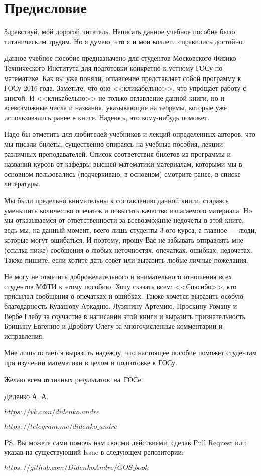 \chapter{Предисловие}
Здравствуй, мой дорогой читатель. Написать данное учебное пособие было титаническим трудом. Но я думаю, что я и мои коллеги справились достойно.

Данное учебное пособие предназначено для студентов Московского Физико-Технического Института для подготовки конкретно к устному ГОСу по математике. Как вы уже поняли, оглавление представляет собой программу к ГОСу 2016 года. Заметьте, что оно <<кликабельно>>, что упрощает работу с книгой. И <<кликабельно>> не только оглавление данной книги, но и всевозможные числа и названия, указывающие на теоремы, которые уже использовались ранее в книге. Надеюсь, это кому-нибудь поможет. 

Надо бы отметить для любителей учебников и лекций определенных авторов, что мы писали билеты, существенно опираясь на учебные пособия, лекции различных преподавателей. Список соответствия билетов из программы и названий курсов от кафедры высшей математики материалам, которыми мы в основном пользовались (подчеркиваю, в основном) смотрите ранее, в списке литературы.

Мы были предельно внимательны к составлению данной книги, стараясь уменьшить количество опечаток и повысить качество излагаемого материала. Но мы отказываемся от ответственности за всевозможные недочеты в этой книге, ведь мы, на данный момент, всего лишь студенты 3-ого курса, а главное --- люди, которые могут ошибаться. И поэтому, прошу Вас не забывать отправлять мне (ссылка ниже) сообщения о любых неточностях, опечатках, ошибках, недочетах. Также пишите, если хотите дать совет или выразить любые личные пожелания. 

Не могу не отметить доброжелательного и внимательного отношения всех студентов МФТИ к этому пособию. Хочу сказать всем: <<Спасибо>>, кто присылал сообщения о опечатках и ошибках. Также хочется выразить особую благодарность Кудашову Аркадию, Лузянину Артемию, Проскину Роману и Вербе Глебу за соучастие в написании этой книги и выразить признательность Брицыну Евгению и Дроботу Олегу за многочисленные комментарии и исправления.
 
Мне лишь остается выразить надежду, что настоящее пособие поможет студентам при изучении математики в целом и подготовке к ГОСу.
\vspace*{\baselineskip}

Желаю всем отличных результатов~на~ГОСе.

\mbox{}

\noindent Диденко А. А.

\noindent\href{https://vk.com/didenko.andre}{$https://vk.com/didenko.andre$}

\noindent\href{https://telegram.me/didenko_andre}{$https://telegram.me/didenko\_andre$}

\mbox{}

\noindent PS. Вы можете сами помочь нам своими действиями, сделав Pull Request или указав на существующий Issue в следующем репозитории:

\noindent\href{https://github.com/DidenkoAndre/GOS_book}{$https://github.com/DidenkoAndre/GOS\_book$}